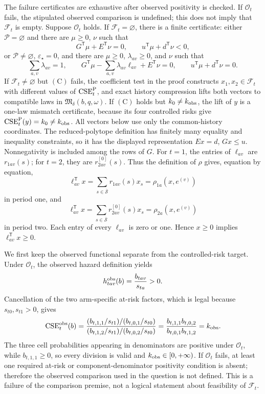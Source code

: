 The failure certificates are exhaustive after observed positivity is checked.  If \(\mathcal O_t\) fails, the stipulated observed comparison is undefined; this does not imply that \(\mathcal F_t\) is empty.  Suppose \(\mathcal O_t\) holds.  If \(\mathcal F_t=\varnothing\), there is a finite certificate: either \(\mathcal P=\varnothing\) and there are \(\mu\geq0\), \(\nu\) such that
\[
 G^{\mathsf T}\mu+E^{\mathsf T}\nu=0,
 \qquad u^{\mathsf T}\mu+d^{\mathsf T}\nu<0,
\]
or \(\mathcal P\neq\varnothing\), \(\varepsilon_\star=0\), and there are \(\mu\geq0\), \(\lambda_{av}\geq0\), and \(\nu\) such that
\[
 \sum_{a,v}\lambda_{av}=1,\qquad
 G^{\mathsf T}\mu-\sum_{a,v}\lambda_{av}\ell_{av}
       +E^{\mathsf T}\nu=0,\qquad
 u^{\mathsf T}\mu+d^{\mathsf T}\nu=0.
\]
If \(\mathcal F_t\neq\varnothing\) but \((\mathrm C)\) fails, the coefficient test in the proof constructs \(x_1,x_2\in\mathcal F_t\) with different values of \(\operatorname{CSE}^{\rm P}_t\), and exact history compression lifts both vectors to compatible laws in \(\mathfrak M_\delta(b,q,\omega)\).  If \((\mathrm C)\) holds but \(k_0\neq k_{\rm obs}\), the lift of \(y\) is a one-law mismatch certificate, because its four controlled risks give \(\operatorname{CSE}^{\rm P}_t(y)=k_0\neq k_{\rm obs}\).
All vectors below use only the common-history coordinates.  The reduced-polytope definition has finitely many equality and inequality constraints, so it has the displayed representation \(Ex=d\), \(Gx\leq u\).  Nonnegativity is included among the rows of \(G\).  For \(t=1\), the entries of \(\ell_{av}\) are \(r_{1av}(s)\); for \(t=2\), they are \(r^{[0]}_{2av}(s)\).  Thus the definition of \(\rho\) gives, equation by equation,
\[
 \ell_{av}^{\mathsf T}x
 =\sum_{s\in\overline{\mathcal S}}r_{1av}(s)x_s
 =\rho_{1a}(x,e^{(v)})
\]
in period one, and
\[
 \ell_{av}^{\mathsf T}x
 =\sum_{s\in\overline{\mathcal S}}r^{[0]}_{2av}(s)x_s
 =\rho_{2a}(x,e^{(v)})
\]
in period two.  Each entry of every \(\ell_{av}\) is zero or one.  Hence \(x\geq0\) implies \(\ell_{av}^{\mathsf T}x\geq0\).

We first keep the observed functional separate from the controlled-risk target.  Under \(\mathcal O_t\), the observed hazard definition yields
\[
 h^{\rm obs}_{tav}(b)=\frac{b_{tav}}{s_{ta}}>0.
\]
Cancellation of the two arm-specific at-risk factors, which is legal because \(s_{t0},s_{t1}>0\), gives
\[
 \operatorname{CSE}^{\rm obs}_t(b)
 =\frac{(b_{t,1,1}/s_{t1})/(b_{t,0,1}/s_{t0})}
 {(b_{t,1,2}/s_{t1})/(b_{t,0,2}/s_{t0})}
 =\frac{b_{t,1,1}b_{t,0,2}}{b_{t,0,1}b_{t,1,2}}
 =k_{\rm obs}.
\]
The three cell probabilities appearing in denominators are positive under \(\mathcal O_t\), while \(b_{t,1,1}\geq0\), so every division is valid and \(k_{\rm obs}\in[0,+\infty)\).  If \(\mathcal O_t\) fails, at least one required at-risk or component-denominator positivity condition is absent; therefore the observed comparison used in the question is not defined.  This is a failure of the comparison premise, not a logical statement about feasibility of \(\mathcal F_t\).

